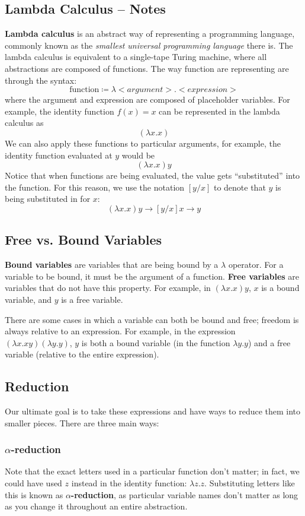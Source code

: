 \documentclass[12pt]{article}
\begin{document}
	\begin{center}
		\section*{Lambda Calculus -- Notes}
	\end{center}
	\textbf{Lambda calculus} is an abstract way of representing a programming language, commonly known as the \textit{smallest universal programming language} there is. The lambda calculus is equivalent to a single-tape Turing machine, where all abstractions are composed of functions. The way function are representing are through the syntax: \[ \text{function} \coloneqq \lambda <argument>.<expression>\]
	where the argument and expression are composed of placeholder variables. For example, the identity function $f(x) = x$ can be represented in the lambda calculus as \[ (\lambda x.x)\] We can also apply these functions to particular arguments, for example, the identity function evaluated at $y$ would be \[ (\lambda x.x)y\] Notice that when functions are being evaluated, the value gets ``substituted'' into the function. For this reason, we use the notation $[y/x]$ to denote that $y$ is being substituted in for $x$: \[ (\lambda x.x)y \to [y/x]x \to y\]

	\subsection*{Free vs. Bound Variables}
	\textbf{Bound variables} are variables that are being bound by a $\lambda$ operator. For a variable to be bound, it must be the argument of a function. \textbf{Free variables} are variables that do not have this property. For example, in $(\lambda x.x)y$, $x$ is a bound variable, and $y$ is a free variable. 

	There are some cases in which a variable can both be bound and free; freedom is always relative to an expression. For example, in the expression $(\lambda x.xy)(\lambda y.y)$, $y$ is both a bound variable (in the function $\lambda y.y$) and a free variable (relative to the entire expression). 

	\subsection*{Reduction}
	Our ultimate goal is to take these expressions and have ways to reduce them into smaller pieces. There are three main ways:
	\subsubsection*{$\alpha$-reduction}
	Note that the exact letters used in a particular function don't matter; in fact, we could have used $z$ instead in the identity function: $\lambda z.z$. Substituting letters like this is known as \textbf{$\alpha$-reduction}, as particular variable names don't matter as long as you change it throughout an entire abstraction. 
\end{document}
